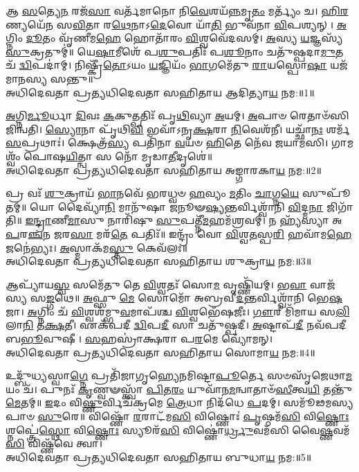 

𑌆 \ul{𑌸}\-𑌤𑍍𑌯𑍇\-\ul{𑌨} 𑌰𑌜᳴\-\ul{𑌸𑌾} 𑌵𑌰𑍍𑌤᳴𑌮𑌾𑌨𑍋 𑌨𑌿\-\ul{𑌵𑍇}\-𑌶𑌯᳴\-\ul{𑌨𑍍𑌨}\-𑌮𑍃\-\ul{𑌤𑌂} 𑌮𑌰𑍍𑌤𑍍𑌯𑌂᳴ 𑌚। \ul{𑌹𑌿}\-\-\ul{𑌰}\-𑌣𑍍𑌯𑌯𑍇᳴𑌨 𑌸\-\ul{𑌵𑌿}\-𑌤𑌾 𑌰\-\ul{𑌥𑍇}\-𑌨𑌾𑌽\-\ul{𑌦𑍇}\-𑌵𑍋 𑌯𑌾᳴\-\ul{𑌤𑌿} 𑌭𑍁𑌵᳴𑌨𑌾 \ul{𑌵𑌿}\-𑌪𑌶𑍍𑌯𑌨𑍍। \ul{𑌅}\-𑌗𑍍𑌨𑌿𑌂 \ul{𑌦𑍂}\-𑌤𑌂 𑌵𑍃᳴𑌣𑍀𑌮\-\ul{𑌹𑍇} 𑌹𑍋𑌤𑌾᳴𑌰𑌂 \ul{𑌵𑌿}\-𑌶𑍍𑌵𑌵𑍇᳴𑌦𑌸𑌮𑍍। \ul{𑌅}\-𑌸𑍍𑌯 \ul{𑌯}\-𑌜𑍍𑌞𑌸𑍍𑌯᳴ \ul{𑌸𑍁}\-𑌕𑍍𑌰𑌤𑍁𑌮𑍍॑॥ 𑌯𑍇\-\ul{𑌷𑌾}\-𑌮𑍀𑌶𑍇᳴ 𑌪\-\ul{𑌶𑍁}\-𑌪𑌤𑌿𑌃᳴ 𑌪\-\ul{𑌶𑍂}\-𑌨𑌾𑌂 𑌚𑌤𑍁᳴𑌷𑍍𑌪𑌦𑌾\-\ul{𑌮𑍁}\-𑌤 𑌚᳴ \ul{𑌦𑍍𑌵𑌿}\-𑌪𑌦𑌾॑𑌮𑍍। 𑌨𑌿𑌷𑍍𑌕𑍍𑌰𑍀᳴\-\ul{𑌤𑍋}\-𑌽𑌯𑌂 \ul{𑌯}\-𑌜𑍍𑌞𑌿𑌯𑌂᳴ \ul{𑌭𑌾}\-𑌗𑌮𑍇᳴𑌤𑍁 \ul{𑌰𑌾}\-𑌯𑌸𑍍𑌪𑍋\-\ul{𑌷𑌾} 𑌯𑌜᳴𑌮𑌾𑌨𑌸𑍍𑌯 𑌸𑌨𑍍𑌤𑍁॥ \\
𑌅𑌧𑌿𑌦𑍇𑌵𑌤𑌾 𑌪𑍍𑌰𑌤𑍍𑌯𑌧𑌿𑌦𑍇𑌵𑌤𑌾 𑌸𑌹𑌿𑌤𑌾𑌯 𑌆𑌦𑌿𑌤𑍍𑌯𑌾\-\ul{𑌯} 𑌨𑌮:॥1॥ 

\-\ul{𑌅}\-𑌗𑍍𑌨𑌿\-\ul{𑌰𑍍𑌮𑍂}\-𑌰𑍍𑌧𑌾 \ul{𑌦𑌿}\-𑌵𑌃 \ul{𑌕}\-𑌕𑍁𑌤𑍍𑌪𑌤𑌿𑌃᳴ 𑌪𑍃\-\ul{𑌥𑌿}\-𑌵𑍍𑌯𑌾 \ul{𑌅}\-𑌯𑌮𑍍। \ul{𑌅}\-𑌪𑌾𑍞 𑌰𑍇𑌤𑌾𑍞᳴𑌸𑌿 𑌜𑌿𑌨𑍍𑌵𑌤𑌿। \ul{𑌸𑍍𑌯𑍋}\-𑌨𑌾 𑌪𑍃᳴𑌥𑌿\-\ul{𑌵𑌿} 𑌭𑌵𑌾᳴𑌽𑌨𑍃\-\ul{𑌕𑍍𑌷}\-𑌰𑌾 \ul{𑌨𑌿}\-𑌵𑍇𑌶᳴𑌨𑍀। 𑌯𑌚𑍍𑌛𑌾᳴\-\ul{𑌨𑌃} 𑌶𑌰𑍍𑌮᳴ \ul{𑌸}\-𑌪𑍍𑌰𑌥𑌾𑌃॑। 𑌕𑍍𑌷𑍇𑌤𑍍𑌰᳴\-\ul{𑌸𑍍𑌯} 𑌪𑌤𑌿᳴𑌨𑌾 \ul{𑌵}\-𑌯𑍞 \ul{𑌹𑌿}\-𑌤𑍇 𑌨𑍇᳴𑌵 𑌜𑌯𑌾𑌮𑌸𑌿। 𑌗𑌾𑌮𑌶𑍍𑌵𑌂᳴ 𑌪𑍋𑌷\-\ul{𑌯𑌿}\-𑌤𑍍𑌨𑍍𑌵𑌾 𑌸 𑌨𑍋᳴ 𑌮𑍃𑌡𑌾\-\ul{𑌤𑍀}\-𑌦𑍃𑌶𑍇॑॥ \\
𑌅𑌧𑌿𑌦𑍇𑌵𑌤𑌾 𑌪𑍍𑌰𑌤𑍍𑌯𑌧𑌿𑌦𑍇𑌵𑌤𑌾 𑌸𑌹𑌿𑌤𑌾𑌯 𑌅𑌙𑍍𑌗𑌾𑌰𑌕𑌾\-\ul{𑌯} 𑌨𑌮:॥2॥ 

𑌪𑍍𑌰 𑌵𑌃᳴ \ul{𑌶𑍁}\-𑌕𑍍𑌰𑌾𑌯᳴ \ul{𑌭𑌾}\-𑌨𑌵𑍇᳴ 𑌭𑌰𑌧𑍍𑌵𑍞 \ul{𑌹}\-𑌵𑍍𑌯𑌂 \ul{𑌮}\-𑌤𑌿𑌂 \ul{𑌚𑌾}\-𑌗𑍍𑌨\-\ul{𑌯𑍇} 𑌸𑍁𑌪𑍂᳴𑌤𑌮𑍍॥ 𑌯𑍋 𑌦𑍈𑌵𑍍𑌯𑌾᳴\-\ul{𑌨𑌿} 𑌮𑌾𑌨𑍁᳴𑌷𑌾 \ul{𑌜}\-𑌨𑍂𑍟\-\ul{𑌷𑍍𑌯}\-𑌨𑍍𑌤𑌰𑍍𑌵𑌿𑌶𑍍𑌵𑌾᳴𑌨𑌿 \ul{𑌵𑌿}\-𑌦𑍍𑌮\-\ul{𑌨𑌾} 𑌜𑌿𑌗𑌾᳴𑌤𑌿॥ \ul{𑌇}\-\-\ul{𑌨𑍍𑌦𑍍𑌰𑌾}\-𑌣𑍀\-\ul{𑌮𑌾}\-𑌸𑍁 𑌨𑌾𑌰𑌿᳴𑌷𑍁 \ul{𑌸𑍁}\-𑌪𑌤𑍍𑌨𑍀᳴\-\ul{𑌮}\-𑌹𑌮᳴𑌶𑍍𑌰𑌵𑌮𑍍। 𑌨 𑌹𑍍𑌯᳴𑌸𑍍𑌯𑌾 𑌅\-\ul{𑌪}\-𑌰\-\ul{𑌞𑍍𑌚}\-𑌨 \ul{𑌜}\-𑌰\-\ul{𑌸𑌾} 𑌮𑌰᳴\-\ul{𑌤𑍇} 𑌪𑌤𑌿𑌃᳴॥ 𑌇𑌨𑍍𑌦𑍍𑌰𑌂᳴ 𑌵𑍋 \ul{𑌵𑌿}\-𑌶𑍍𑌵\-\ul{𑌤}\-𑌸𑍍𑌪\-\ul{𑌰𑌿} 𑌹𑌵𑌾᳴𑌮\-\ul{𑌹𑍇} 𑌜𑌨𑍇॑𑌭𑍍𑌯𑌃। \ul{𑌅}\-𑌸𑍍𑌮𑌾𑌕᳴𑌮\-\ul{𑌸𑍍𑌤𑍁} 𑌕𑍇𑌵᳴𑌲𑌃॥ \\
𑌅𑌧𑌿𑌦𑍇𑌵𑌤𑌾 𑌪𑍍𑌰𑌤𑍍𑌯𑌧𑌿𑌦𑍇𑌵𑌤𑌾 𑌸𑌹𑌿𑌤𑌾𑌯 𑌶𑍁𑌕𑍍𑌰𑌾\-\ul{𑌯} 𑌨𑌮:॥3॥ 

𑌆𑌪𑍍𑌯𑌾᳴𑌯\-\ul{𑌸𑍍𑌵} 𑌸𑌮𑍇᳴𑌤𑍁 𑌤𑍇 \ul{𑌵𑌿}\-𑌶𑍍𑌵𑌤𑌃᳴ 𑌸𑍋\-\ul{𑌮} 𑌵𑍃𑌷𑍍𑌣𑌿᳴𑌯𑌮𑍍। 𑌭\-\ul{𑌵𑌾} 𑌵𑌾𑌜᳴𑌸𑍍𑌯 𑌸\-\ul{𑌙𑍍𑌗}\-𑌥𑍇॥ \ul{𑌅}\-𑌫𑍍𑌸𑍁 \ul{𑌮𑍇} 𑌸𑍋𑌮𑍋᳴ 𑌅𑌬𑍍𑌰𑌵𑍀\-\ul{𑌦}\-𑌨𑍍𑌤𑌰𑍍𑌵𑌿𑌶𑍍𑌵𑌾᳴𑌨𑌿 𑌭𑍇\-\ul{𑌷}\-𑌜𑌾। \ul{𑌅}\-𑌗𑍍𑌨𑌿𑌂 𑌚᳴ \ul{𑌵𑌿}\-𑌶𑍍𑌵𑌶᳴𑌮𑍍𑌭𑍁\-\ul{𑌵}\-𑌮𑌾𑌪᳴𑌶𑍍𑌚 \ul{𑌵𑌿}\-𑌶𑍍𑌵𑌭𑍇᳴𑌷𑌜𑍀𑌃। \ul{𑌗𑍗}\-𑌰𑍀 𑌮𑌿᳴𑌮𑌾𑌯 𑌸\-\ul{𑌲𑌿}\-𑌲𑌾\-\ul{𑌨𑌿} 𑌤\-\ul{𑌕𑍍𑌷}\-𑌤𑍀। 𑌏𑌕᳴𑌪𑌦𑍀 \ul{𑌦𑍍𑌵𑌿}\-𑌪\-\ul{𑌦𑍀} 𑌸𑌾 𑌚𑌤𑍁᳴𑌷𑍍𑌪𑌦𑍀। \ul{𑌅}\-𑌷𑍍𑌟𑌾𑌪᳴\-\ul{𑌦𑍀} 𑌨𑌵᳴𑌪𑌦𑍀 𑌬\-\ul{𑌭𑍂}\-𑌵𑍁𑌷𑍀। \ul{𑌸}\-𑌹𑌸𑍍𑌰𑌾॑𑌕𑍍𑌷𑌰𑌾 𑌪\-\ul{𑌰}\-𑌮𑍇 𑌵𑍍𑌯𑍋᳴𑌮𑌨𑍍। \\
𑌅𑌧𑌿𑌦𑍇𑌵𑌤𑌾 𑌪𑍍𑌰𑌤𑍍𑌯𑌧𑌿𑌦𑍇𑌵𑌤𑌾 𑌸𑌹𑌿𑌤𑌾𑌯 𑌸𑍋𑌮𑌾\-\ul{𑌯} 𑌨𑌮:॥4॥ 

𑌉𑌦𑍍𑌬𑍁᳴𑌧𑍍𑌯𑌸𑍍𑌵𑌾\-\ul{𑌗𑍍𑌨𑍇} 𑌪𑍍𑌰𑌤𑌿᳴𑌜𑌾𑌗𑍃𑌹𑍍𑌯𑍇𑌨𑌮𑌿𑌷𑍍𑌟𑌾\-\ul{𑌪𑍂}\-𑌰𑍍𑌤𑍇 𑌸𑍞𑌸𑍃᳴𑌜𑍇𑌥𑌾\-\ul{𑌮}\-𑌯𑌂 𑌚᳴। 𑌪𑍁𑌨𑌃᳴ \ul{𑌕𑍃}\-𑌣𑍍𑌵𑍟𑌸𑍍𑌤𑍍𑌵𑌾᳴ \ul{𑌪𑌿}\-𑌤\-\ul{𑌰𑌂} 𑌯𑍁𑌵𑌾᳴𑌨\-\ul{𑌮}\-𑌨𑍍𑌵𑌾𑌤𑌾𑍞᳴\-\ul{𑌸𑍀}\-𑌤𑍍𑌵\-\ul{𑌯𑌿} 𑌤𑌨𑍍𑌤𑍁᳴\-\ul{𑌮𑍇}\-𑌤𑌮𑍍॥ \ul{𑌇}\-𑌦𑌂 𑌵𑌿\-\ul{𑌷𑍍𑌣𑍁}\-𑌰𑍍𑌵𑌿𑌚᳴𑌕𑍍𑌰𑌮𑍇 \ul{𑌤𑍍𑌰𑍇}\-𑌧𑌾 𑌨𑌿𑌦᳴𑌧𑍇 \ul{𑌪}\-𑌦𑌮𑍍। 𑌸𑌮𑍂᳴𑌢𑌮𑌸𑍍𑌯𑌪𑌾𑍞 \ul{𑌸𑍁}\-𑌰𑍇॥ 𑌵𑌿𑌷𑍍𑌣𑍋᳴ \ul{𑌰}\-𑌰𑌾𑌟᳴𑌮\-\ul{𑌸𑌿} 𑌵𑌿𑌷𑍍𑌣𑍋𑌃॑ \ul{𑌪𑍃}\-𑌷𑍍𑌠𑌮᳴\-\ul{𑌸𑌿} 𑌵𑌿\-\ul{𑌷𑍍𑌣𑍋𑌃} 𑌶𑍍𑌨𑌪𑍍𑌤𑍍𑌰𑍇॑\-\ul{𑌸𑍍𑌥𑍋} 𑌵𑌿\-\ul{𑌷𑍍𑌣𑍋𑌃} 𑌸𑍍𑌯𑍂𑌰᳴\-\ul{𑌸𑌿} 𑌵𑌿𑌷𑍍𑌣𑍋॑\-\ul{𑌰𑍍𑌧𑍍𑌰𑍁}\-𑌵𑌮᳴𑌸𑌿 𑌵𑍈\-\ul{𑌷𑍍𑌣}\-𑌵𑌮᳴\-\ul{𑌸𑌿} 𑌵𑌿𑌷𑍍𑌣᳴𑌵𑍇 𑌤𑍍𑌵𑌾। \\
𑌅𑌧𑌿𑌦𑍇𑌵𑌤𑌾 𑌪𑍍𑌰𑌤𑍍𑌯𑌧𑌿𑌦𑍇𑌵𑌤𑌾 𑌸𑌹𑌿𑌤𑌾𑌯 𑌬𑍁𑌧𑌾\-\ul{𑌯} 𑌨𑌮:॥5॥ 

